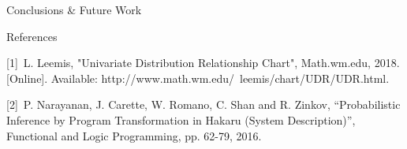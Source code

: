 \documentclass[22pt]{beamer}
\begin{document}
\begin{frame}[fragile]
\begin{textblock}{5}
\begin{block}{\Large{Conclusions \& Future Work}}
{}

\end{block}


\begin{block}{\Large{References}}

\scriptsize{[1]~L. Leemis, "Univariate Distribution Relationship Chart", Math.wm.edu, 2018. [Online]. Available: http://www.math.wm.edu/~leemis/chart/UDR/UDR.html. 

[2]~P. Narayanan, J. Carette, W. Romano, C. Shan and R. Zinkov, “Probabilistic Inference by Program Transformation in Hakaru (System Description)”, Functional and Logic Programming, pp. 62-79, 2016.}


\end{block}


% 

\end{textblock}
\end{frame}
\end{document}
